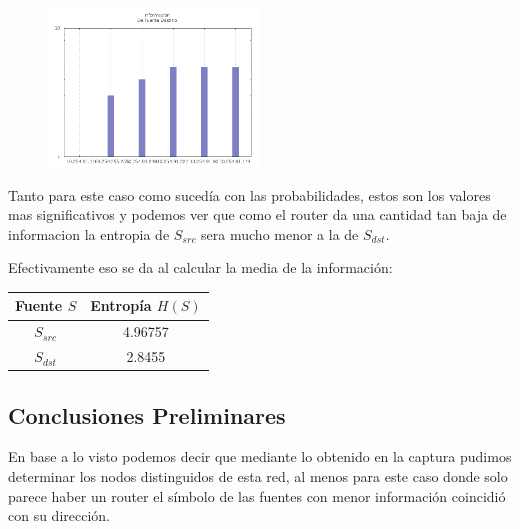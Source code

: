 \begin{figure}[!ht]
    \centering
    \includegraphics[width=0.5\textwidth]{img/graph/escenario_3/info_dst.png}
\end{figure}

	\par Tanto para este caso como sucedía con las probabilidades, estos son los valores mas significativos y podemos ver que como el router da una cantidad tan baja de informacion la entropia de $S_{src}$ sera mucho menor a la de $S_{dst}$.

	\par Efectivamente eso se da al calcular la media de la información:
    
\vspace{6 mm}

\begin{center}
\begin{tabular}{|c|c|}
\hline
Fuente $S$ & Entropía $H(S)$\\
\hline
$S_{src}$ & 4.96757\\
$S_{dst}$ & 2.8455\\
\hline
\end{tabular}
\end{center}

\subsection{Conclusiones Preliminares}

\par En base a lo visto podemos decir que mediante lo obtenido en la captura pudimos determinar los nodos distinguidos de esta red, al menos para este caso donde solo parece haber un router el símbolo de las fuentes con menor información coincidió con su dirección.
